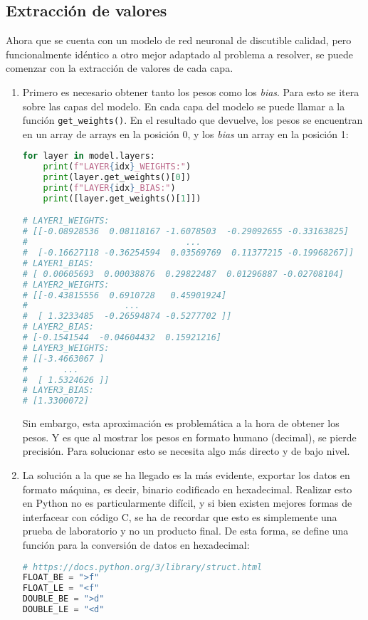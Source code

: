 \subsection{Extracción de valores}
\label{ssec:extraccion_valores}
Ahora que se cuenta con un modelo de red neuronal de discutible calidad, pero funcionalmente idéntico a otro mejor adaptado al problema a resolver, se puede comenzar con la extracción de valores de cada capa.

\begin{enumerate}
    \item Primero es necesario obtener tanto los pesos como los \textit{bias}. Para esto se itera sobre las capas del modelo. En cada capa del modelo se puede llamar a la función \texttt{get\_weights()}. En el resultado que devuelve, los pesos se encuentran en un array de arrays en la posición 0, y los \textit{bias} un array en la posición 1:\medskip
\begin{lstlisting}[language=Python]
for layer in model.layers:
    print(f"LAYER{idx}_WEIGHTS:")
    print(layer.get_weights()[0])
    print(f"LAYER{idx}_BIAS:")
    print([layer.get_weights()[1]])

# LAYER1_WEIGHTS:
# [[-0.08928536  0.08118167 -1.6078503  -0.29092655 -0.33163825]
#                               ...
#  [-0.16627118 -0.36254594  0.03569769  0.11377215 -0.19968267]]
# LAYER1_BIAS:
# [ 0.00605693  0.00038876  0.29822487  0.01296887 -0.02708104]
# LAYER2_WEIGHTS:
# [[-0.43815556  0.6910728   0.45901924]
#                   ...
#  [ 1.3233485  -0.26594874 -0.5277702 ]]
# LAYER2_BIAS:
# [-0.1541544  -0.04604432  0.15921216]
# LAYER3_WEIGHTS:
# [[-3.4663067 ]
#       ...
#  [ 1.5324626 ]]
# LAYER3_BIAS:
# [1.3300072]
\end{lstlisting}
    Sin embargo, esta aproximación es problemática a la hora de obtener los pesos. Y es que al mostrar los pesos en formato humano (decimal), se pierde precisión. Para solucionar esto se necesita algo más directo y de bajo nivel.
    
    \item La solución a la que se ha llegado es la más evidente, exportar los datos en formato máquina, es decir, binario codificado en hexadecimal. Realizar esto en Python no es particularmente difícil, y si bien existen mejores formas de interfacear con código C, se ha de recordar que esto es simplemente una prueba de laboratorio y no un producto final. De esta forma, se define una función para la conversión de datos en hexadecimal:\medskip
\begin{lstlisting}[language=Python]
# https://docs.python.org/3/library/struct.html
FLOAT_BE = ">f"
FLOAT_LE = "<f"
DOUBLE_BE = ">d"
DOUBLE_LE = "<d"


\end{lstlisting}
\end{enumerate}
